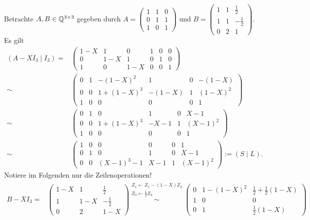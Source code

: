 \documentclass[../../main.tex]{subfiles}
\begin{document}
\begin{bsp}\label{17.4.13}
    Betrachte $A,B\in\mathbb Q^{3\times 3}$ gegeben durch $A=\begin{pmatrix*}1&1&0\\0&1&1\\1&0&1\end{pmatrix*}$ und $B=\begin{pmatrix}1&1&\frac{1}{2}\\1&1&-\frac{1}{2}\\0&2&1\end{pmatrix}$. Es gilt
    \begin{align*}
        (A-XI_3\mid I_3)=&\left(\begin{array}{ccc|ccc}1-X&1&0&1&0&0\\
        0&1-X&1&0&1&0\\1&0&1-X&0&0&1\end{array}\right)\\
        \sim&\left(\begin{array}{ccc|ccc}0&1&-(1-X)^2&1&0&-(1-X)\\0&0&1+(1-X)^3&-(1-X)&1&(1-X)^2\\1&0&0&0&0&1\end{array}\right)\\
        \sim&\left(\begin{array}{ccc|ccc}0&1&0&1&0&X-1\\0&0&1+(1-X)^3&-X-1&1&(X-1)^2\\1&0&0&0&0&1\end{array}\right)\\
        \sim&\left(\begin{array}{ccc|ccc}1&0&0&0&0&1\\0&1&0&1&0&X-1\\0&0&(X-1)^3-1&X-1&1&(X-1)^2\end{array}\right):=(S\mid L).
    \end{align*}
    Notiere im Folgenden nur die Zeilenoperationen!
    \begin{align*}
        B-XI_3=&\begin{pmatrix}1-X&1&\frac{1}{2}\\1&1-X&-\frac{1}{2}\\0&2&1-X\end{pmatrix}\stackrel{\begin{smallmatrix}Z_1\leftarrow Z_1-(1-X)Z_2\\ Z_3\leftarrow \frac{1}{2}Z_3\end{smallmatrix}}{\sim}\begin{pmatrix}0&1-(1-X)^2&\frac{1}{2}+\frac{1}{2}(1-X)\\1&0&0\\0&1&\frac{1}{2}(1-X)\end{pmatrix}\\

\end{align*}
\end{bsp}
\end{document}
